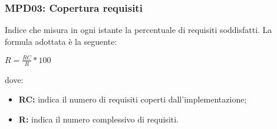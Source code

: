     \subsubsection{MPD03: Copertura requisiti}
    Indice che misura in ogni istante la percentuale di requisiti soddisfatti.
    La formula adottata è la seguente:
    \begin{center}
        $R = \displaystyle \frac{RC}{R}*100$
    \end{center}
    dove:
    \begin{itemize}
        \item \textbf{RC:} indica il numero di requisiti coperti dall'implementazione;
        \item \textbf{R:} indica il numero complessivo di requisiti.
    \end{itemize}
